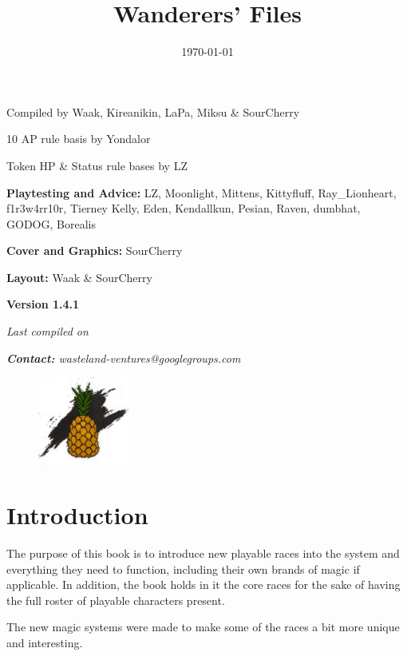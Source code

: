 \documentclass[11pt,a4paper,twocolumn]{book}
\title{Wanderers' Files}
\date{\today}
\begin{document}
	
			
	\onecolumn
	\setcounter{page}{1}	
	\begin{center}
		Compiled by Waak, Kireanikin, LaPa, Miksu \& SourCherry
		
		10 AP rule basis by Yondalor
		
		Token HP \& Status rule bases by LZ
		
		\bigskip		
		\textbf{Playtesting and Advice:} LZ, Moonlight, Mittens, Kittyfluff, Ray\_Lionheart, f1r3w4rr10r, Tierney Kelly, Eden, Kendallkun, Pesian, Raven, dumbhat, GODOG, Borealis
		
		\bigskip
		\textbf{Cover and Graphics:} SourCherry
		
		\bigskip
		\textbf{Layout:} Waak \& SourCherry		

	\end{center}
	
	\vfill
	
	\begin{center}
		\textbf{Version 1.4.1}
		
		\emph{Last compiled on \thedate}
        
        \emph{\textbf{Contact:} wasteland-ventures@googlegroups.com}
     
	\end{center}	
    \begin{figure}[bp]
		\centering
		\includegraphics[width=3cm]{ART/ISA_Logo}
	\end{figure}

	\twocolumn
	\tableofcontents


	\chapter{Introduction}
	
	The purpose of this book is to introduce new playable races into the system and everything they need to function, including their own brands of magic if applicable. In addition, the book holds in it the core races for the sake of having the full roster of playable characters present.
	
	The new magic systems were made to make some of the races a bit more unique and interesting.
	
\end{document}
